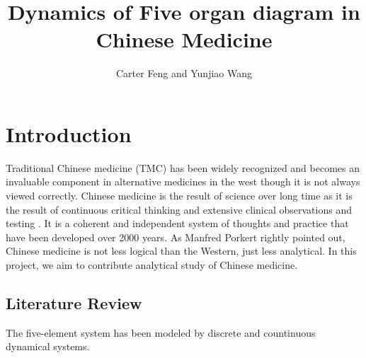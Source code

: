 \documentclass{article}
\title{Dynamics of Five organ diagram in Chinese Medicine}
\author{Carter Feng and Yunjiao Wang}
\begin{document}
\maketitle

\section{Introduction}

Traditional Chinese medicine (TMC) has been widely recognized  and becomes an invaluable component in alternative medicines in the west \cite{Kaptchuk2000} though it is not always viewed correctly.   Chinese medicine is the result of science over long time as it is the result of continuous critical thinking and extensive clinical observations and testing \cite{Kaptchuk2000}. It is a coherent and independent system of thoughts and practice that have been developed over 2000 years.   As Manfred Porkert \cite{Porkert1990} rightly pointed out, Chinese medicine is not less logical than the Western, just less analytical. In this project, we aim to contribute analytical study of Chinese medicine. 




\subsection{Literature Review}
The five-element system has been modeled by discrete and countinuous dynamical systems. 
\end{document}

